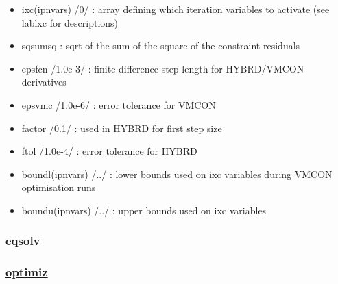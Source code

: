 \documentclass[]{article}
\begin{document}
\begin{itemize}
\begin{itemize}
    (71) ensure that neomp = separatrix density (nesep) x neratio
  \item
    (72) central solenoid Tresca stress limit (itv 123 foh\_stress)
  \item
    (73) Psep \textgreater{}= Plh + Paux (itv 137 (fplhsep))
  \item
    (74) TFC quench \textless{} tmax\_croco (itv 141 (fcqt))
  \item
    (75) TFC current/copper area \textless{} Maximum (itv 143
    f\_copperA\_m2)
  \item
    (76) Eich critical separatrix density
  \item
    (77) TF coil current per turn upper limit
  \item
    (78) Reinke criterion impurity fraction lower limit (itv 147
    freinke)
  \item
    (79) F-value for max peak CS field (itv 149 fbmaxcs)
  \item
    (80) F-value for min pdivt (itv 153 fpdivlim)
  \item
    (81) F-value for ne(0) \textgreater{} ne(ped) constraint (itv 154
    fne0)
  \end{itemize}
\item
  ixc(ipnvars) /0/ : array defining which iteration variables to
  activate (see lablxc for descriptions)
\item
  sqsumsq : sqrt of the sum of the square of the constraint residuals
\item
  epsfcn /1.0e-3/ : finite difference step length for HYBRD/VMCON
  derivatives
\item
  epsvmc /1.0e-6/ : error tolerance for VMCON
\item
  factor /0.1/ : used in HYBRD for first step size
\item
  ftol /1.0e-4/ : error tolerance for HYBRD
\item
  boundl(ipnvars) /../ : lower bounds used on ixc variables during VMCON
  optimisation runs
\item
  boundu(ipnvars) /../ : upper bounds used on ixc variables
\end{itemize}

\hypertarget{eqsolv}{%
\subsubsection{\texorpdfstring{\href{eqsolv.html}{eqsolv}}{eqsolv}}\label{eqsolv}}

\hypertarget{optimiz}{%
\subsubsection{\texorpdfstring{\href{optimiz.html}{optimiz}}{optimiz}}\label{optimiz}}
\end{document}
